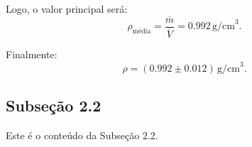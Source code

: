 \documentclass{article}
\begin{document}
\begin{multicols*}{2}
        Logo, o valor principal será:
\begin{equation}
\rho_{\text{média}} = \frac{\overline{m}}{\overline{V}} = 0.992 \, \text{g/cm}^3.
\end{equation}

Finalmente:
\begin{equation}
\rho = (0.992 \pm 0.012) \, \text{g/cm}^3.
\end{equation}

        
    \subsection{Subseção 2.2}
    Este é o conteúdo da Subseção 2.2.
    
    \end{multicols*} %
    
    
\end{document}
